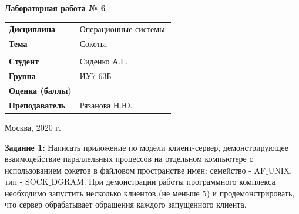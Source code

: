 \documentclass[a4paper,14pt]{extreport} %
\begin{document}
\begin{titlepage}
    \vspace{2cm}

    \begin{center}
        \textbf{Лабораторная работа № 6} \\
        \vspace{0.5cm}
    \end{center}

    \vspace{4cm}

    \begin{flushleft}
        \begin{tabular}{ll}
            \textbf{Дисциплина} & Операционные системы.  \\
            \textbf{Тема} & Сокеты.  \\
            \\
            \textbf{Студент} & Сиденко А.Г. \\
            \textbf{Группа} & ИУ7-63Б \\
            \textbf{Оценка (баллы)} & \\
            \textbf{Преподаватель} & Рязанова Н.Ю.   \\
        \end{tabular}
    \end{flushleft}

    \vspace{4cm}

   \begin{center}
        Москва, 2020 г.
    \end{center}

\end{titlepage}

\hfill

\textbf{Задание 1:} Написать приложение по модели клиент-сервер, демонстрирующее взаимодействие параллельных процессов на отдельном компьютере с использованием сокетов в файловом пространстве имен: семейство - AF$\_$UNIX, тип - SOCK$\_$DGRAM. При демонстрации работы программного комплекса необходимо запустить несколько клиентов (не меньше 5) и продемонстрировать, что сервер обрабатывает обращения каждого запущенного клиента.
\end{document}
